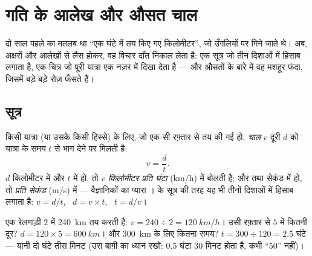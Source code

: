 \chapter{गति के आलेख और औसत चाल}\label{ch:g7:motion-average-speed}

दो साल पहले  का मतलब था ``एक घंटे में तय किए गए किलोमीटर'', जो
उँगलियों पर गिने जाते थे। अब, अक्षरों और आलेखों से लैस होकर, वह विचार
दाँत निकाल लेता है: एक सूत्र जो तीन दिशाओं में हिसाब लगाता है, एक चित्र
जो पूरी यात्रा एक नज़र में दिखा देता है --- और औसतों के बारे में वह
मशहूर फंदा, जिसमें बड़े-बड़े रोज़ फँसते हैं।

\section{सूत्र}

\begin{definition}[चाल, सूत्र से]\label{def:g7:motion-average-speed:formula}
किसी यात्रा (या उसके किसी हिस्से) के लिए, जो एक-सी रफ़्तार से तय की
गई हो, \emph{चाल} $v$ दूरी $d$ को यात्रा के समय $t$ से भाग
देने पर मिलती है:
\[
v = \frac{d}{t}.
\]
$d$ किलोमीटर में और $t$  में हो, तो $v$ \emph{किलोमीटर प्रति
घंटा} (\unit{km/h}) में बोलती है; और  तथा सेकंड में हो, तो
\emph{ प्रति सेकंड} (\unit{m/s}) में --- वैज्ञानिकों का प्यारा
।  के सूत्र की तरह यह भी तीनों दिशाओं में हिसाब लगाता है:
$v = d/t$, \ $d = v \times t$, \ $t = d/v$।
\end{definition}

\begin{example}[नुस्ख़े काम पर]\label{ex:g7:motion-average-speed:recipes}
एक रेलगाड़ी $2$  में \qty{240}{km} तय करती है: $v = 240 \div 2 =
\qty{120}{km/h}$। उसी रफ़्तार से $5$  में कितनी दूर? $d = 120
\times 5 = \qty{600}{km}$। और \qty{300}{km} के लिए कितना समय? $t = 300
\div 120 = 2.5$ घंटे --- यानी दो घंटे तीस मिनट (उस बाग़ी का ध्यान
रखो: $0.5$ घंटा $30$ मिनट होता है, कभी ``$50$'' नहीं)।
\end{example}

